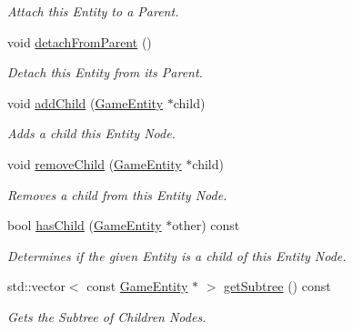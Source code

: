 \begin{DoxyCompactItemize}
\begin{DoxyCompactList}\small\item\em Attach this Entity to a Parent. \end{DoxyCompactList}\item 
\mbox{\label{class_game_entity_a4a541201ff89465ec071061f58073ea1}} 
void \mbox{\hyperlink{class_game_entity_a4a541201ff89465ec071061f58073ea1}{detach\+From\+Parent}} ()
\begin{DoxyCompactList}\small\item\em Detach this Entity from its Parent. \end{DoxyCompactList}\item 
void \mbox{\hyperlink{class_game_entity_ae0dbd0aede5390f909e3d7d355d9b79a}{add\+Child}} (\mbox{\hyperlink{class_game_entity}{Game\+Entity}} $\ast$child)
\begin{DoxyCompactList}\small\item\em Adds a child this Entity Node. \end{DoxyCompactList}\item 
void \mbox{\hyperlink{class_game_entity_a68a209e6f5e4626cd8b892ca2f999f06}{remove\+Child}} (\mbox{\hyperlink{class_game_entity}{Game\+Entity}} $\ast$child)
\begin{DoxyCompactList}\small\item\em Removes a child from this Entity Node. \end{DoxyCompactList}\item 
bool \mbox{\hyperlink{class_game_entity_a273f246386eeb6551607493402af1369}{has\+Child}} (\mbox{\hyperlink{class_game_entity}{Game\+Entity}} $\ast$other) const
\begin{DoxyCompactList}\small\item\em Determines if the given Entity is a child of this Entity Node. \end{DoxyCompactList}\item 
\mbox{\label{class_game_entity_ae0079d2ebc360cd1b07e391f8e590ce0}} 
std\+::vector$<$ const \mbox{\hyperlink{class_game_entity}{Game\+Entity}} $\ast$ $>$ \mbox{\hyperlink{class_game_entity_ae0079d2ebc360cd1b07e391f8e590ce0}{get\+Subtree}} () const
\begin{DoxyCompactList}\small\item\em Gets the Subtree of Children Nodes. \end{DoxyCompactList}\item 

\end{DoxyCompactItemize}
